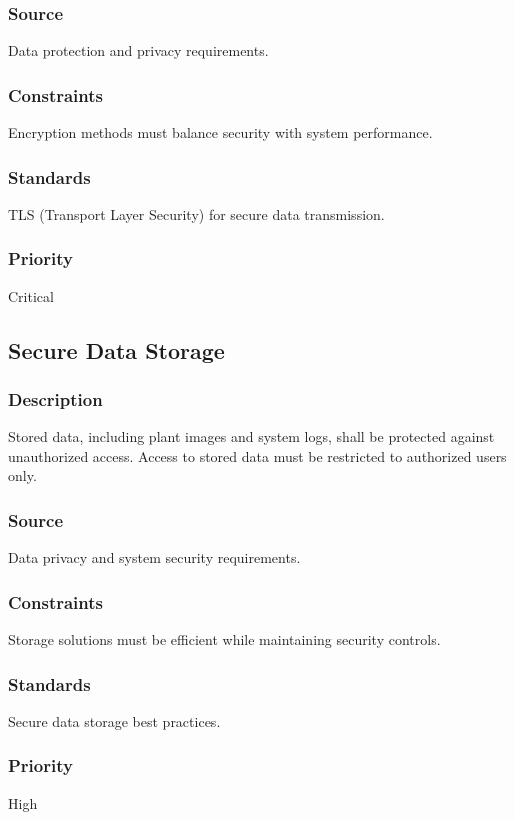 \subsubsection{Source}
Data protection and privacy requirements.

\subsubsection{Constraints}
Encryption methods must balance security with system performance.

\subsubsection{Standards}
TLS (Transport Layer Security) for secure data transmission.

\subsubsection{Priority}
Critical


\subsection{Secure Data Storage}
\subsubsection{Description}
Stored data, including plant images and system logs, shall be protected against unauthorized access. Access to stored data must be restricted to authorized users only.

\subsubsection{Source}
Data privacy and system security requirements.

\subsubsection{Constraints}
Storage solutions must be efficient while maintaining security controls.

\subsubsection{Standards}
Secure data storage best practices.

\subsubsection{Priority}
High


